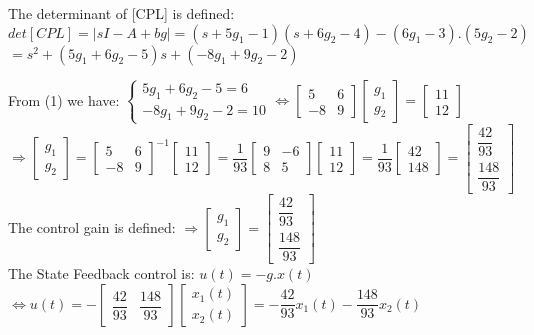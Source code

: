 \documentclass[14pt,a4paper]{article}
\begin{document}
\begin{enumerate}
		The determinant of [CPL] is defined: \\
		$det[CPL] = |sI-A+bg| = (s+5g_1-1)(s+6g_2-4) - (6g_1-3).(5g_2-2)$\\
		\hspace*{4.6cm} $ = s^2 + (5g_1 + 6g_2 -5)s + (-8g_1+9g_2-2)  $ 
		
		From (1) we have:
		$\begin{cases} 5g_1 + 6g_2 -5 = 6 \\	-8g_1 + 9g_2 -2 = 10	\end{cases} \Leftrightarrow \begin{bmatrix} 5&6 \\ -8&9 \end{bmatrix} \begin{bmatrix} g_1\\g_2 \end{bmatrix} = \begin{bmatrix} 11\\12 \end{bmatrix} $ \\[0.2cm]
		$ \Rightarrow \begin{bmatrix} g_1\\g_2 \end{bmatrix} = {\begin{bmatrix} 5&6 \\ -8&9 \end{bmatrix}}^{-1} \begin{bmatrix} 11\\12 \end{bmatrix} = \dfrac{1}{93} \begin{bmatrix} 9&-6 \\ 8&5\end{bmatrix} \begin{bmatrix} 11\\12 \end{bmatrix} = \dfrac{1}{93} \begin{bmatrix} 42\\148 \end{bmatrix} = \begin{bmatrix} \dfrac{42}{93} \\[0.3cm] \dfrac{148}{93} \end{bmatrix}$ \\[0.2cm]
		The control gain is defined: $ \Rightarrow \begin{bmatrix} g_1\\g_2 \end{bmatrix} = \begin{bmatrix} \dfrac{42}{93} \\[0.3cm] \dfrac{148}{93} \end{bmatrix}$ \\
	
		The State Feedback control is: $u(t) = -g.x(t) $\\
		\hspace*{1cm} $\Leftrightarrow u(t) = -\begin{bmatrix} \dfrac{42}{93} & \dfrac{148}{93} \end{bmatrix} \begin{bmatrix} x_1(t)\\x_2(t) \end{bmatrix} = -\dfrac{42}{93}x_1(t) - \dfrac{148}{93}x_2(t)$ \\
	
\end{enumerate}
\end{document}
